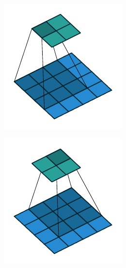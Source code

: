 \begin{figure}[tbp!]
    \begin{subfigure}[b]{0.24\textwidth}
        \centering
        \includegraphics[width=\textwidth]{graphics/neuralnetworks/no_padding_no_strides_00.pdf}
        \caption{}
        \label{fig: Neural networks: no_padding_no_strides_00}
    \end{subfigure}
    \hfill
    \begin{subfigure}[b]{0.24\textwidth}
        \centering
        \includegraphics[width=\textwidth]{graphics/neuralnetworks/no_padding_no_strides_01.pdf}

\end{subfigure}
\end{figure}
